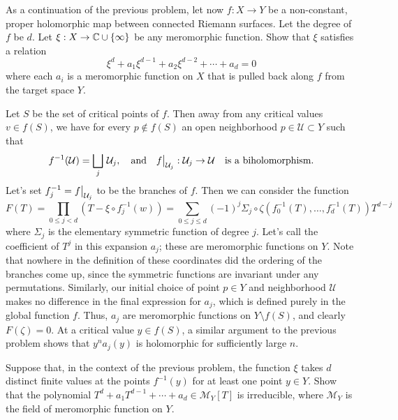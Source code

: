 \documentclass{lkx_pset}
\begin{document}
\begin{problem}{3}
As a continuation of the previous problem, let now $f : X \to Y$ be a non-constant, proper holomorphic map between connected Riemann surfaces. Let the degree of $f$ be $d$. Let $\xi : X \to \mathbb{C} \cup \{\infty\}$ be any meromorphic function. Show that $\xi$ satisfies a relation
\[
	\xi^d + a_1\xi^{d-1} + a_2\xi^{d-2}+\cdots+a_d = 0
\]
where each $a_i$ is a meromorphic function on $X$ that is pulled back along $f$ from the target space $Y$.
\end{problem}

\begin{solution}
	Let $S$ be the set of critical points of $f$. Then away from any critical values $v\in f(S)$, we have for every $p\not\in f(S)$ an open neighborhood $p\in \mathcal{U} \subset Y$ such that
	\[
		f^{-1}(\mathcal{U})=\bigsqcup_j\, \mathcal{U}_j, \quad \textrm{and}\quad \restr{f}{\mathcal{U}_j} : \mathcal{U}_j \to \mathcal{U}\quad\textrm{is a biholomorphism.}
	\]
	Let's set $f_j^{-1} = \restr{f}{\mathcal{U}_j}$ to be the branches of $f$. Then we can consider the function
	\[
		F(T) = \prod_{0\leq j< d} (T-\xi\circ f_j^{-1}(w)) = \sum_{0\leq j \leq d} (-1)^{j}\Sigma_j\circ \zeta(f_0^{-1}(T), \ldots, f_d^{-1}(T)) T^{d-j}
	\]
	where $\Sigma_j$ is the elementary symmetric function of degree $j$. Let's call the coefficient of $T^j$ in this expansion $a_j$; these are meromorphic functions on $Y$. Note that nowhere in the definition of these coordinates did the ordering of the branches come up, since the symmetric functions are invariant under any permutations.
	Similarly, our initial choice of point $p\in Y$ and neighborhood $\mathcal{U}$ makes no difference in the final expression for $a_j$, which is defined purely in the global function $f$. Thus, $a_j$ are meromorphic functions on $Y\setminus f(S)$, and clearly $F(\zeta)=0$. At a critical value $y\in f(S)$, a similar argument to the previous problem shows that $y^n a_j(y)$ is holomorphic for sufficiently large $n$.
\end{solution}

\begin{problem}{4}
Suppose that, in the context of the previous problem, the function $\xi$ takes $d$ distinct finite values at the points $f^{-1}(y)$ for at least one point $y\in Y$. Show that the polynomial $T^d + a_1 T^{d-1}+\cdots +a_d\in \mathcal{M}_Y[T]$ is irreducible, where $\mathcal{M}_Y$ is the field of meromorphic function on $Y$.
\end{problem}
\end{document}

